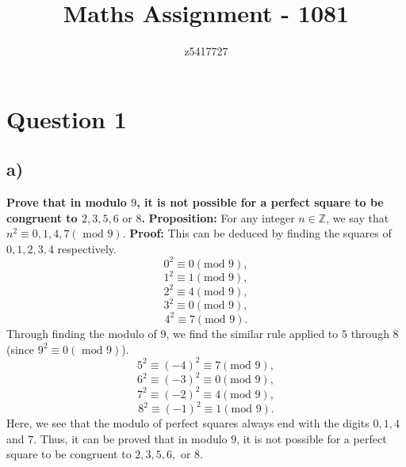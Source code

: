 \documentclass{article}
\title{Maths Assignment - 1081}
\author{z5417727}
\begin{document}
\maketitle
{\LARGE \tableofcontents}
\newpage
\section{Question 1}
\subsection{a)}
\textbf{ Prove that in modulo $9$, it is not possible for a perfect square to be congruent to $2, 3, 5, 6 \text{ or } 8$.}
\newline
\newline
\textbf{ Proposition: } For any integer $n \in \mathbb{Z}$, we say that $n^2 \equiv 0, 1, 4, 7 (\text{ mod } 9).$ 
\newline
\newline
\textbf{Proof: } This can be deduced by finding the squares of $0, 1, 2, 3, 4$ respectively.
$$0^2 \equiv 0 (\text{mod }9),$$
$$1^2 \equiv 1 (\text{mod }9),$$
$$2^2 \equiv 4 (\text{mod }9),$$
$$3^2 \equiv 0 (\text{mod }9),$$
$$4^2 \equiv 7 (\text{mod }9).$$
Through finding the modulo of $9$, we find the similar rule applied to $5$ through $8$ (since $9^2 \equiv 0 (\text{ mod } 9)$).
$$5^2 \equiv (-4)^2 \equiv 7 (\text{mod }9),$$
$$6^2 \equiv (-3)^2 \equiv 0 (\text{mod }9),$$
$$7^2 \equiv (-2)^2 \equiv 4 (\text{mod }9),$$
$$8^2 \equiv (-1)^2 \equiv 1 (\text{mod }9).$$
Here, we see that the modulo of perfect squares always end with the digits $0, 1, 4$ and $7$. Thus, it can be proved that in modulo $9$, it is not possible for a perfect square to be congruent to $2, 3, 5, 6, \text{ or } 8$.
\newpage
\end{document}
